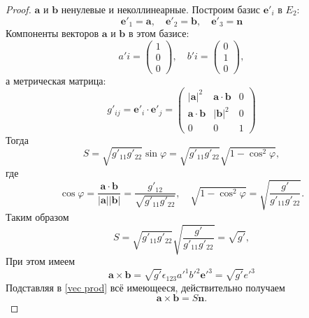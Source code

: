 \begin{theorem}
\begin{proof}
		$\mathbf{a}$ и $\mathbf{b}$ ненулевые и неколлинеарные. Построим базис $\mathbf{e}'_i$ в $E_2$:
		\begin{equation*}
			\mathbf{e}'_1 = \mathbf{a},\quad\mathbf{e}'_2=\mathbf{b},\quad\mathbf{e}'_3=\mathbf{n}
		\end{equation*}
		Компоненты векторов $\mathbf{a}$ и $\mathbf{b}$ в этом базисе:
		\begin{equation*}
			a'i=\begin{pmatrix}
				1\\0\\0
			\end{pmatrix},\quad
			b'i=\begin{pmatrix}
				0\\1\\0
			\end{pmatrix},
		\end{equation*}
		а метрическая матрица:
		\begin{equation*}
			g'_{ij}=\mathbf{e}'_i\cdot\mathbf{e}'_j=\begin{pmatrix}
				|\mathbf{a}|^2            & \mathbf{a}\cdot\mathbf{b} & 0 \\
				\mathbf{a}\cdot\mathbf{b} & |\mathbf{b}|^2            & 0 \\
				0                         & 0                         & 1
			\end{pmatrix}
		\end{equation*}
		Тогда
		\begin{equation*}
			S=\sqrt{g'_{11}g'_{22}}\sin{\varphi}=\sqrt{g'_{11}g'_{22}}\sqrt{1-\cos^2{\varphi}},
		\end{equation*}
		где
		\begin{equation*}
			\cos\varphi = \frac{\mathbf{a}\cdot\mathbf{b}}{|\mathbf{a}||\mathbf{b}|}=\frac{g'_{12}}{\sqrt{g'_{11}g'_{22}}}, \quad\sqrt{1-\cos^2{\varphi}} = \sqrt{\frac{g'}{g'_{11}g'_{22}}}.
		\end{equation*}
		Таким образом
		\begin{equation*}
			S = \sqrt{g'_{11}g'_{22}}\sqrt{\frac{g'}{g'_{11}g'_{22}}} = \sqrt{g'},
		\end{equation*}
		При этом имеем
		\begin{equation}\label{vec prod}
			\mathbf{a} \times \mathbf{b} = \sqrt{g'} \epsilon_{123} a'^1b'^2\mathbf{e}'^3=\sqrt{g'}e'^3
		\end{equation}
		Подставляя в \eqref{vec prod} всё имеющееся, действительно получаем
		\begin{equation*}
			\mathbf{a} \times \mathbf{b} = S\mathbf{n}.
		\end{equation*}
	\end{proof}
\end{theorem}
